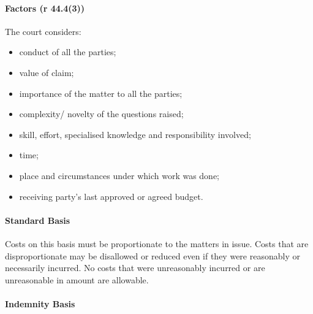 \documentclass[
]{article}
\providecommand{\tightlist}{%
  \setlength{\itemsep}{0pt}\setlength{\parskip}{0pt}}
\begin{document}
\hypertarget{factors-r-44.43}{%
\paragraph{Factors (r 44.4(3))}\label{factors-r-44.43}}

The court considers:

\begin{itemize}
\tightlist
\item
  conduct of all the parties;
\item
  value of claim;
\item
  importance of the matter to all the parties;
\item
  complexity/ novelty of the questions raised;
\item
  skill, effort, specialised knowledge and responsibility involved;
\item
  time;
\item
  place and circumstances under which work was done;
\item
  receiving party's last approved or agreed budget.
\end{itemize}

\hypertarget{standard-basis}{%
\paragraph{Standard Basis}\label{standard-basis}}

Costs on this basis must be proportionate to the matters in issue. Costs
that are disproportionate may be disallowed or reduced even if they were
reasonably or necessarily incurred. No costs that were unreasonably
incurred or are unreasonable in amount are allowable.

\hypertarget{indemnity-basis}{%
\paragraph{Indemnity Basis}\label{indemnity-basis}}
\end{document}
